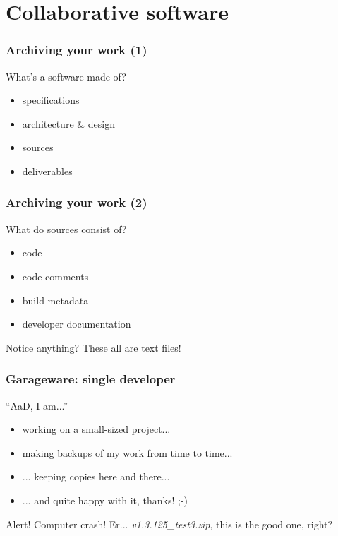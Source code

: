 \section{Collaborative software}
\begin{frame}
  \frametitle{Archiving your work (1)}

  What's a software made of?
  \begin{itemize}
    \item specifications
    \item architecture \& design
    \item sources
    \item deliverables
  \end{itemize}
\end{frame}

\begin{frame}
  \frametitle{Archiving your work (2)}

  What do sources consist of?
  \begin{itemize}
    \item code
    \item code comments
    \item build metadata
    \item developer documentation
  \end{itemize}
  \begin{block}{Notice anything?}
    These all are text files! %
  \end{block}
\end{frame}

\begin{frame}
  \frametitle{Garageware: single developer}

  ``AaD, I am...''
  \begin{itemize}
    \item working on a small-sized project...
    \item making backups of my work from time to time...
    \item ... keeping copies here and there...
    \item ... and quite happy with it, thanks! ;-)
  \end{itemize}
  \begin{alertblock}{Alert! Computer crash!}
    Er... \textit{v1.3.125\_test3.zip}, this is the good one, right?
  \end{alertblock}
\end{frame}

